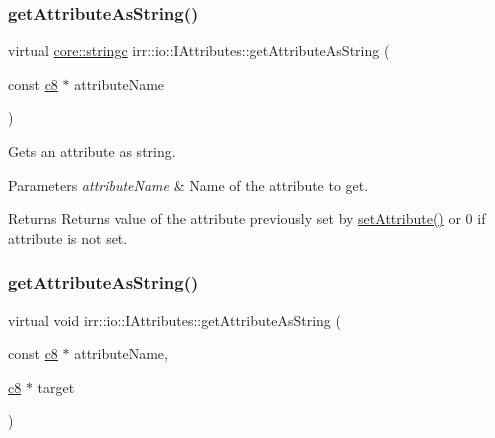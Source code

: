\subsubsection{\texorpdfstring{get\+Attribute\+As\+String()}{getAttributeAsString()}\hspace{0.1cm}{\footnotesize\ttfamily [1/3]}}
{\footnotesize\ttfamily virtual \hyperlink{namespaceirr_1_1core_ade1071a878633f2f6d8a75c5d11fec19}{core\+::stringc} irr\+::io\+::\+I\+Attributes\+::get\+Attribute\+As\+String (\begin{DoxyParamCaption}\item[{const \hyperlink{namespaceirr_a9395eaea339bcb546b319e9c96bf7410}{c8} $\ast$}]{attribute\+Name }\end{DoxyParamCaption})\hspace{0.3cm}{\ttfamily [pure virtual]}}



Gets an attribute as string. 


\begin{DoxyParams}{Parameters}
{\em attribute\+Name} & Name of the attribute to get. \\
\hline
\end{DoxyParams}
\begin{DoxyReturn}{Returns}
Returns value of the attribute previously set by \hyperlink{classirr_1_1io_1_1IAttributes_a03fa31acb481ae23678676cc183f09a6}{set\+Attribute()} or 0 if attribute is not set. 
\end{DoxyReturn}
\mbox{\label{classirr_1_1io_1_1IAttributes_a8d10d4874bcb90143ba11f6c548cff42}} 
\subsubsection{\texorpdfstring{get\+Attribute\+As\+String()}{getAttributeAsString()}\hspace{0.1cm}{\footnotesize\ttfamily [2/3]}}
{\footnotesize\ttfamily virtual void irr\+::io\+::\+I\+Attributes\+::get\+Attribute\+As\+String (\begin{DoxyParamCaption}\item[{const \hyperlink{namespaceirr_a9395eaea339bcb546b319e9c96bf7410}{c8} $\ast$}]{attribute\+Name,  }\item[{\hyperlink{namespaceirr_a9395eaea339bcb546b319e9c96bf7410}{c8} $\ast$}]{target }\end{DoxyParamCaption})\hspace{0.3cm}{\ttfamily [pure virtual]}}



